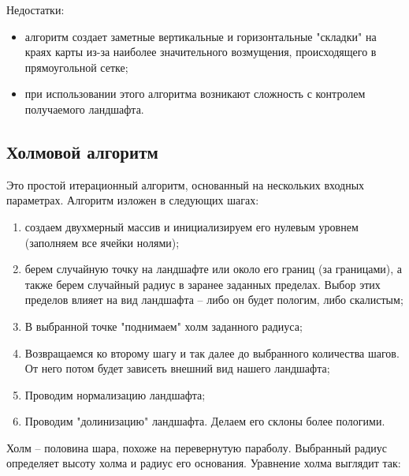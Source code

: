 Недостатки:

\begin{itemize}[label=--]
	\item алгоритм создает заметные вертикальные и горизонтальные "складки" на краях карты из-за наиболее значительного возмущения, происходящего в прямоугольной сетке;
	\item при использовании этого алгоритма возникают сложность с контролем получаемого ландшафта. 
\end{itemize}

\subsection{Холмовой алгоритм}

Это простой итерационный алгоритм, основанный на нескольких входных параметрах. Алгоритм изложен в следующих шагах:

\begin{enumerate}[label={\arabic*)}]
	\item создаем двухмерный массив и инициализируем его нулевым уровнем (заполняем все ячейки нолями);
	\item берем случайную точку на ландшафте или около его границ (за границами), а также берем случайный радиус в заранее заданных пределах. Выбор этих пределов влияет на вид ландшафта -- либо он будет пологим, либо скалистым; 
	\item В выбранной точке "поднимаем" холм заданного радиуса;
	\item Возвращаемся ко второму шагу и так далее до выбранного количества шагов. От него потом будет зависеть внешний вид нашего ландшафта;
	\item Проводим нормализацию ландшафта;
	\item Проводим "долинизацию" ландшафта. Делаем его склоны более пологими.
\end{enumerate}

Холм – половина шара, похоже на перевернутую параболу. Выбранный радиус определяет высоту холма и радиус его основания. Уравнение холма выглядит так: 
